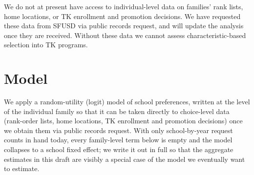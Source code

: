\documentclass{article}
\begin{document}
We do not at present have access to individual-level data on families' rank lists, home locations, or TK enrollment and promotion decisions. We have requested these data from SFUSD via public records request, and will update the analysis once they are received. Without these data we cannot assess characteristic-based selection into TK programs.


\section{Model}
\label{sec:model}
We apply a random-utility (logit) model of school preferences, written at the level of the individual family so that it can be taken directly to choice-level data (rank-order lists, home locations, TK enrollment and promotion decisions) once we obtain them via public records request. With only school-by-year request counts in hand today, every family-level term below is empty and the model collapses to a school fixed effect; we write it out in full so that the aggregate estimates in this draft are visibly a special case of the model we eventually want to estimate.
\end{document}
